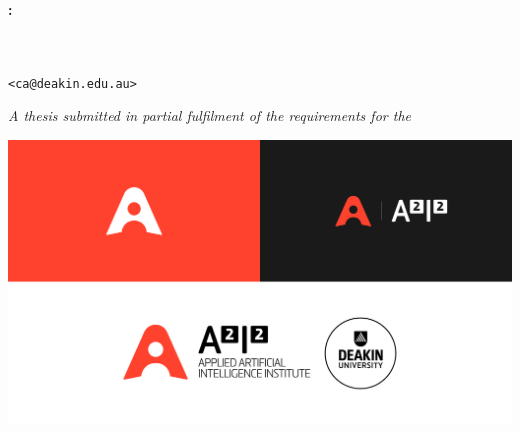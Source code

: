\vspace*{\fill}
\thispagestyle{empty}

\centering

\Large
\textbf{\textit{\thesubtitle}:\\ \themaintitle}
\vspace{0.9 cm}


\theauthor{}\\
\normalsize \theauthorspostnominals{}\\
\texttt{<ca@deakin.edu.au>}
\vspace{0.75 cm}

%
\itshape
A thesis submitted in partial fulfilment of the requirements for the\\
\upshape
\thedegree

\vspace{2 cm}
\includegraphics[width=.8\linewidth]{frontmatter/figures/a2i2}
\vspace{2 cm}

\upshape\large
\thedepartment{}\\
\theinstitution{}\\
\thelocation

\vspace{1cm}
\thedate{}
\vspace*{\fill}

\justify
\normalsize
\restoregeometry